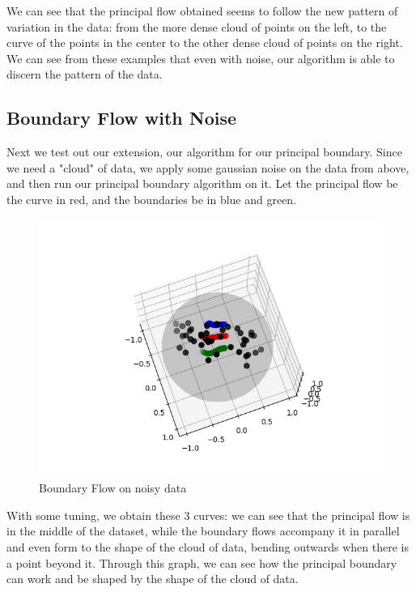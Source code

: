 \documentclass[12pt]{report}
\begin{document}
We can see that the principal flow obtained seems to follow the new pattern 
of variation in the data: from the more dense cloud of points on the left, to the curve of
the points in the center to the other dense cloud of points on the right.
We can see from these examples that even with noise, our algorithm is able to discern 
the pattern of the data.

\subsection{Boundary Flow with Noise}

Next we test out our extension, our algorithm for our principal boundary.
Since we need a "cloud" of data, we apply some gaussian noise on the data from above,
and then run our principal boundary algorithm on it. Let the principal flow
be the curve in red, and the boundaries be in blue and green.

\begin{figure}[h]
    \begin{center}
        \includegraphics[scale=0.8]{noisy_boundary_flow13.png}
        \caption{Boundary Flow on noisy data}
        \label{fig:boundaryflows}
    \end{center}
\end{figure}

With some tuning, we obtain these 3 curves: we can see that the principal flow
is in the middle of the dataset, while the boundary flows accompany it in parallel
and even form to the shape of the cloud of data, bending outwards
when there is a point beyond it. Through this graph, we can see how the principal
boundary can work and be shaped by the shape of the cloud of data.
\end{document}
